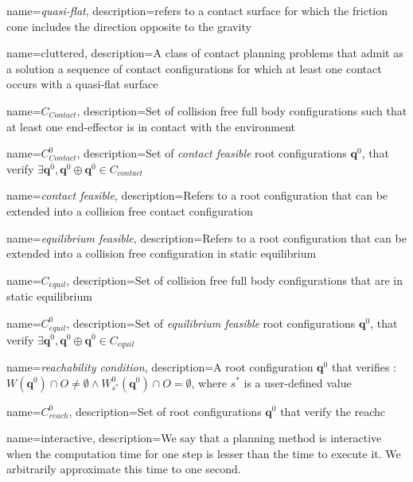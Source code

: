 {
  name=\textit{quasi-flat},
  description={refers to a contact surface for which the friction cone includes the direction opposite to the gravity}
}

{
  name=cluttered,
  description={A class of contact planning problems that admit as a solution a sequence of contact configurations for which at least one contact occurs with a \gls{quasi-flat} surface}
}

{
  name=$C_{Contact}$,
  description={Set of collision free full body configurations such that at least one end-effector is in contact with the environment}
}

{
  name=$C_{Contact}^0$,
  description={Set of \textit{contact feasible} root configurations $\mathbf{q}^{0}$, that verify $\exists \mathbf{q}^{\overline{0}},  \mathbf{q}^{0} \oplus \mathbf{q}^{\overline{0}} \in C_{contact}$}
}

{
  name=\textit{contact feasible},
  description={Refers to a root configuration that can be extended into a collision free contact configuration}
}

{
  name=\textit{equilibrium feasible},
  description={Refers to a root configuration that can be extended into a collision free configuration in static equilibrium}
}


{
  name=$C_{equil}$,
  description={Set of collision free full body configurations that are in static equilibrium}
}

{
  name=$C_{equil}^0$,
  description={Set of \textit{equilibrium feasible} root configurations $\mathbf{q}^{0}$, that verify $\exists \mathbf{q}^{\overline{0}},  \mathbf{q}^{0} \oplus \mathbf{q}^{\overline{0}} \in C_{equil}$}
}

{
  name=\textit{reachability condition},
  description={A root configuration $\mathbf{q}^{0}$ that verifies :\\ $W(\mathbf{q}^{0}) \cap O \neq \emptyset \wedge W^0_{s^*}(\mathbf{q}^{0}) \cap O = \emptyset$,
  where $s^*$ is a user-defined value}
}

{
  name=$C_{reach}^0$,
  description={Set of root configurations  $\mathbf{q}^{0}$ that verify the \gls{reachc}}
}

{
  name=interactive,
  description={We say that a planning method is \gls{interactive} when the computation time for one step is lesser than the
time to execute it. We arbitrarily approximate this time to one second.}
}

